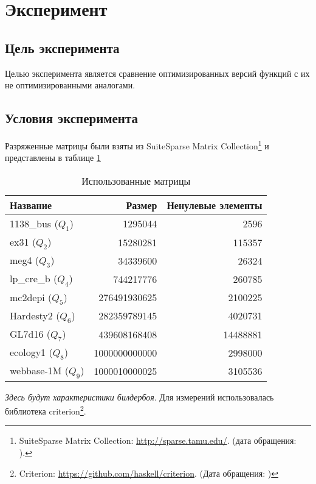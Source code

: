 
\section{Эксперимент}
\subsection{Цель эксперимента}
Целью эксперимента является сравнение оптимизированных версий функций с их не оптимизированными аналогами.
\subsection{Условия эксперимента}
Разряженные матрицы были взяты из SuiteSparse Matrix Collection\footnote{SuiteSparse Matrix Collection: \url{http://sparse.tamu.edu/}. (дата обращения:   ).} и представлены в таблице
\ref{used_matrixes}

\begin{table}[h!]
    \def\arraystretch{1.1}  %
    \setlength\tabcolsep{0.2em}
    \centering
    \caption{Использованные матрицы}
    \begin{tabular}[C]{l|r|r}
        \toprule
        Название &Размер& Ненулевые элементы \\ \midrule
        1138\_bus   ($Q_1$) & 1295044  & 2596 \\
        ex31        ($Q_2$)& 15280281 & 115357 \\
        meg4        ($Q_3$)& 34339600 & 26324 \\
        lp\_cre\_b  ($Q_4$)& 744217776 & 260785 \\
        mc2depi     ($Q_5$)& 276491930625 & 2100225 \\
        Hardesty2   ($Q_6$)& 282359789145 & 4020731 \\
        GL7d16      ($Q_7$)& 439608168408 & 14488881 \\
        ecology1    ($Q_8$)& 1000000000000 & 2998000 \\
        webbase-1M  ($Q_9$)& 1000010000025  & 3105536 \\
        \bottomrule
    \end{tabular}
    \label{used_matrixes}
\end{table}

{\small\textit{Здесь будут характеристики билдербоя}}. Для измерений использовалась библиотека criterion\footnote{Criterion: \url{https://github.com/haskell/criterion}. (Дата обращения: )}.


